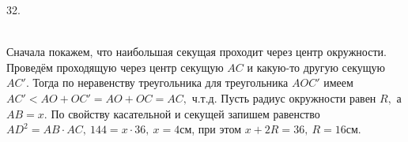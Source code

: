 32. \begin{figure}[ht!]
\end{figure}\\
Сначала покажем, что наибольшая секущая проходит через центр окружности. Проведём проходящую через центр секущую $AC$ и какую-то другую секущую $AC'.$ Тогда по неравенству треугольника для треугольника $AOC'$ имеем $AC'<AO+OC'=AO+OC=AC,$ ч.т.д. Пусть радиус окружности равен $R,$ а $AB=x.$ По свойству касательной и секущей
запишем равенство $AD^2=AB\cdot AC,\ 144=x\cdot 36,\ x=4$см, при этом $x+2R=36,\ R=16$см.\\
